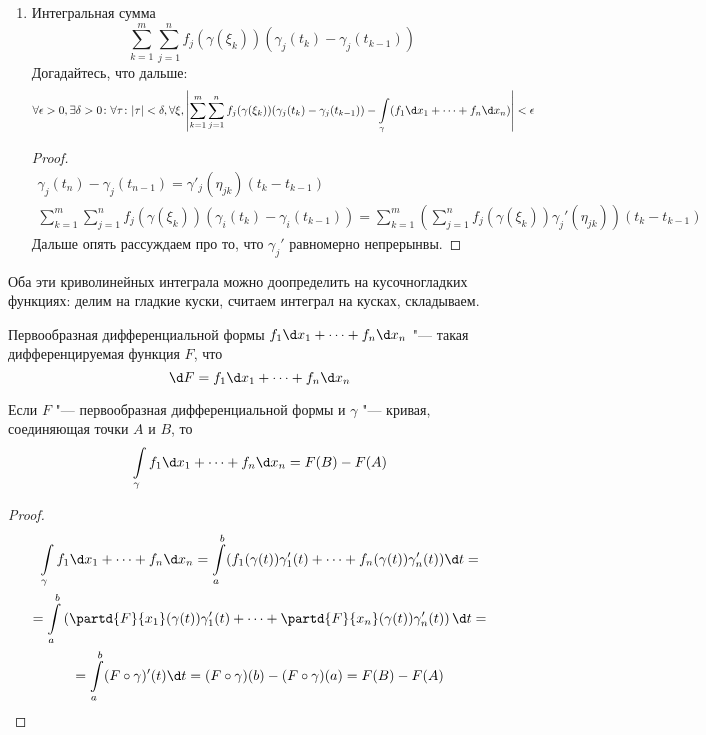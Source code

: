 \begin{enumerate}
\item
	Интегральная сумма
	\[
		\sum_{k=1}^m \sum_{j=1}^n f_j(\gamma(\xi_k)) (\gamma_j(t_k) - \gamma_j(t_{k-1}))
	\]
	Догадайтесь, что дальше:
	\[
		\forall \epsilon > 0, \exists \delta > 0\colon \forall \tau\colon |\tau| < \delta, \forall \xi,
		\left| \sum_{k=1}^m\sum_{j=1}^n f_j(\gamma(\xi_k))(\gamma_j(t_k)-\gamma_j(t_{k-1})) - \int\limits_\gamma (f_1\d x_1+\dots+f_n \d x_n)\right|
		< \epsilon
	\]
	\begin{proof}
		\begin{gather*}
			\gamma_j (t_n) - \gamma_j(t_{n-1}) = \gamma'_j(\eta_{jk})(t_k - t_{k-1}) \\
			\sum_{k=1}^m \sum_{j=1}^n f_j(\gamma(\xi_k)) (\gamma_i(t_k) - \gamma_i(t_{k-1}))
			= \sum_{k=1}^m \left( \sum_{j=1}^n f_j(\gamma(\xi_k)) \gamma_j'(\eta_{jk}) \right) (t_k - t_{k-1})
		\end{gather*}
		Дальше опять рассуждаем про то, что $\gamma_j'$ равномерно непрерынвы.
	\end{proof}
\end{enumerate}

\begin{Rem}
	Оба эти криволинейных интеграла можно доопределить на кусочногладких функциях:
	делим на гладкие куски, считаем интеграл на кусках, складываем.
\end{Rem}

\begin{Def}
	Первообразная дифференциальной формы $f_1 \d x_1 + \dots + f_n \d x_n$ "--- такая дифференцируемая функция $F$, что
	\[ \d F = f_1 \d x_1 + \dots + f_n \d x_n \]
\end{Def}

\begin{theorem}
	Если $F$ "--- первообразная дифференциальной формы и $\gamma$ "--- кривая, соединяющая точки $A$ и $B$, то
	\[ \int\limits_\gamma f_1 \d x_1 + \dots + f_n \d x_n = F(B) - F(A) \]
\end{theorem}
\begin{proof}
	\begin{gather*}
		\int\limits_\gamma f_1 \d x_1 + \dots + f_n \d x_n
		= \int\limits_a^b ( f_1(\gamma(t)) \gamma_1'(t) + \dots + f_n(\gamma(t)) \gamma_n'(t) ) \d t = \\
		= \int\limits_a^b \left( \partd{F}{x_1}(\gamma(t)) \gamma_1'(t) + \dots + \partd{F}{x_n}(\gamma(t)) \gamma_n'(t) \right) \d t = \\
		= \int\limits_a^b (F \circ \gamma)'(t) \d t = (F \circ \gamma)(b) - (F \circ \gamma)(a) = F(B) - F(A)
	\end{gather*}
\end{proof}

